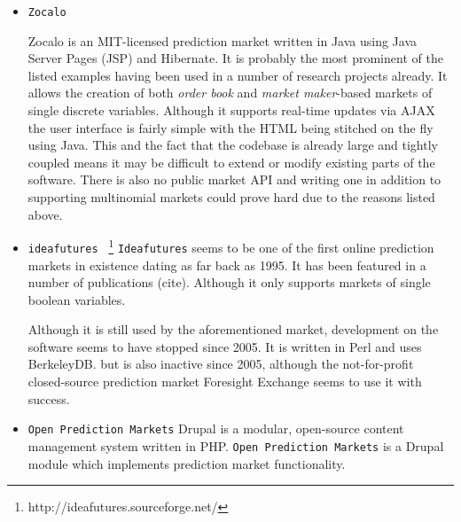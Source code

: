 \documentclass[bsc,frontabs,twoside,singlespacing,parskip,deptreport]{infthesis}     %
\begin{document}
\begin{itemize}
\item {\tt Zocalo}

	Zocalo is an MIT-licensed prediction market written in Java using Java Server Pages (JSP) and Hibernate. It is probably the most prominent of the listed examples having been used in a number of research projects already. It allows the creation of both {\em order book} and {\em market maker}-based markets of single discrete variables. Although it supports real-time updates via AJAX the user interface is fairly simple with the HTML being stitched on the fly using Java. This and the fact that the codebase is already large and tightly coupled means it may be difficult to extend or modify existing parts of the software. There is also no public market API and writing one in addition to supporting multinomial markets could prove hard due to the reasons listed above. 

\item {\tt ideafutures } \footnote{http://ideafutures.sourceforge.net/}
	{\tt Ideafutures} seems to be one of the first online prediction markets in existence dating as far back as 1995. It has been featured in a number of publications (cite). Although it only supports markets of single boolean variables. 

Although it is still used by the aforementioned market, development on the software seems to have stopped since 2005. It is written in Perl and uses BerkeleyDB.  but is also inactive since 2005, although the not-for-profit closed-source prediction market Foresight Exchange seems to use it with success. 

\item {\tt Open Prediction Markets} 
	Drupal is a modular, open-source content management system written in PHP. {\tt Open Prediction Markets} is a Drupal module which implements prediction market functionality. 
\end{itemize}

\end{document}
